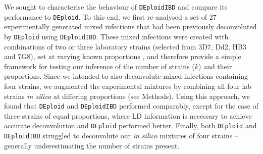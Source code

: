 \documentclass[9pt,lineno]{elife}
\begin{document}
We sought to characterise the behaviour of \texttt{DEploidIBD} and compare its performance to \texttt{DEploid}.  To this end, we first re-analysed a set of 27 experimentally generated mixed infections \citep{Wendler2015} that had been previously deconvoluted by \texttt{DEploid} \citep{Zhu2017} using \texttt{DEploidIBD}. These mixed infections were created with combinations of two or three laboratory strains (selected from 3D7, Dd2, HB3 and 7G8), set at varying known proportions \citep{Wendler2015}, and therefore provide a simple framework for testing our inference of the number of strains ($k$) and their proportions. Since we intended to also deconvolute mixed infections containing four strains, we augmented the experimental mixtures by combining all four lab strains {\it in silico} at differing proportions (see Methods). Using this approach, we found that \texttt{DEploid} and \texttt{DEploidIBD} performed comparably, except for the case of three strains of equal proportions, where LD information is necessary to achieve accurate deconvolution and \texttt{DEploid} performed better. Finally, both \texttt{DEploid} and \texttt{DEploidIBD} struggled to deconvolute our {\it in silico} mixtures of four strains -- generally underestimating the number of strains present.
\end{document}
